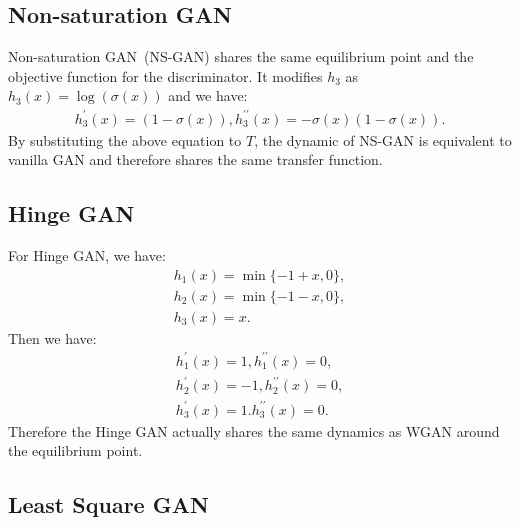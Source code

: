 \documentclass{article}
\theoremstyle{definition}
\begin{document}
\subsection{Non-saturation GAN}
Non-saturation GAN~(NS-GAN) shares the same equilibrium point and the objective function for the discriminator. It modifies $h_3$ as $h_3(x) = \log(\sigma(x))$ and we have:
\begin{align}
   h_3^\prime(x) = (1 - \sigma(x)), h_3^{\prime\prime}(x) = -\sigma(x)(1-\sigma(x)).
\end{align}
By substituting the above equation to $T$, the dynamic of NS-GAN is equivalent to vanilla GAN and therefore shares the same transfer function.

\subsection{Hinge GAN}
For Hinge GAN, we have:
\begin{align}
    h_1(x) = \min\{-1+x, 0\}, \\
    h_2(x) = \min\{-1-x, 0\}, \\
    h_3(x) = x.
\end{align}
Then we have:
\begin{align}
    h_1^\prime(x) = 1, h_1^{\prime\prime}(x) = 0, \\
    h_2^\prime(x) = -1, h_2^{\prime\prime}(x) = 0, \\
    h_3^\prime(x) = 1. h_3^{\prime\prime}(x) = 0.
\end{align}
Therefore the Hinge GAN actually shares the same dynamics as WGAN around the equilibrium point.

\subsection{Least Square GAN}
\end{document}
